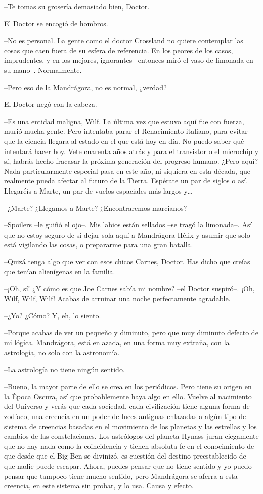 --Te tomas su grosería demasiado bien, Doctor.

El Doctor se encogió de hombros.

--No es personal. La gente como el doctor Crossland no quiere contemplar
las cosas que caen fuera de su esfera de referencia. En los peores de
los casos, imprudentes,  y en los mejores, ignorantes --entonces miró el
vaso de limonada en su mano--. Normalmente.

--Pero eso de la Mandrágora, no es normal, ¿verdad?

El Doctor negó con la cabeza.

--Es una entidad maligna, Wilf. La última vez que estuvo aquí fue con
fuerza, murió mucha gente. Pero intentaba parar el Renacimiento
italiano, para evitar que la ciencia llegara al estado en el que está
hoy en día. No puedo saber qué intentará hacer hoy. Vete cuarenta años
atrás y para el transistor o el microchip y sí, habrás hecho fracasar la
próxima generación del progreso humano. ¿Pero aquí? Nada
particularmente especial pasa en este año, ni siquiera en esta década,
que realmente pueda afectar al futuro de la Tierra. Espérate un par de
siglos o así. Llegaréis a Marte, un par de vuelos espaciales más largos
y\ldots{}

--¿Marte? ¿Llegamos a Marte? ¿Encontraremos marcianos?

--Spoilers --le guiñó el ojo--. Mis labios están sellados --se tragó la
limonada--. Así que no estoy seguro de si dejar sola aquí a Mandrágora
Hélix y asumir que solo está vigilando las cosas, o prepararme para una
gran batalla.

--Quizá tenga algo que ver con esos chicos Carnes, Doctor. Has dicho que
creías que tenían alienígenas en la familia.

--¡Oh, sí! ¿Y cómo es que Joe Carnes sabía mi nombre? --el Doctor
suspiró--. ¡Oh, Wilf, Wilf, Wilf! Acabas de arruinar una noche
perfectamente agradable.

--¿Yo? ¿Cómo? Y, eh, lo siento.

--Porque acabas de ver un pequeño y diminuto, pero que muy diminuto
defecto de mi lógica. Mandrágora, está enlazada, en una forma muy
extraña, con la astrología, no solo con la astronomía.

--La astrología no tiene ningún sentido.

--Bueno, la mayor parte de ello se crea en los periódicos. Pero tiene su
origen en la Época Oscura, así que probablemente haya algo en ello.
Vuelve al nacimiento del Universo y verás que cada sociedad, cada
civilización tiene alguna forma de zodíaco, una creencia en un poder de
luces antiguas enlazadas a algún tipo de sistema de creencias basadas en
el movimiento de los planetas y las estrellas y los cambios de las
constelaciones. Los astrólogos del planeta Hynass juran ciegamente que
no hay nada como la coincidencia y tienen absoluta fe en el conocimiento
de que desde que el Big Ben se divinizó, es cuestión del destino
preestablecido de que nadie puede escapar. Ahora, puedes pensar que no
tiene sentido y yo puedo pensar que tampoco tiene mucho sentido, pero
Mandrágora se aferra a esta creencia, en este sistema sin probar, y lo
usa. Causa y efecto.

